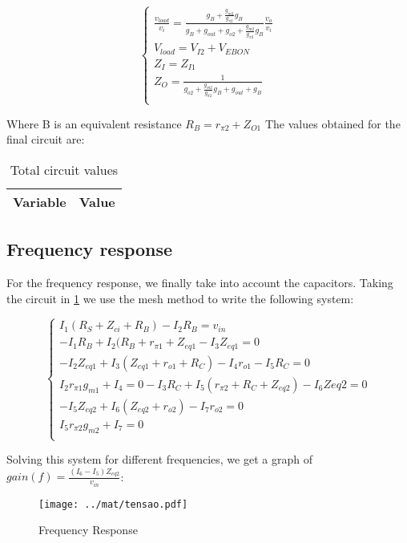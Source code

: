 \begin{equation}\label{eq:final}
\begin{cases}
\frac{v_{load}}{v_i}=\frac{g_B+\frac{g_{m2}}{g_{\pi 2}} g_B}{g_B+g_{out}+g_{o2}+\frac{g_{m2}}{g_{\pi 2}} g_B} \frac{v_o}{v_i}\\
V_{load}=V_{I2}+ V_{EBON}\\
Z_I=Z_{I1}\\
Z_O=\frac{1}{g_{o2}+\frac{g_{m2}}{g_{\pi 2}} g_B+g_{out}+g_B}\\
\end{cases}
\end{equation}

Where B is an equivalent resistance $R_B=r_{\pi 2} + Z_{O1}$
The values obtained for the final circuit are:

\begin{table}[H]
  \centering
  \begin{tabular}{|l|r|}
    \hline    
    {\bf Variable} & {\bf Value} \\ \hline
    
  \end{tabular}
  \caption{Total circuit values}
  \label{tab:sim1}
\end{table}

\subsection{Frequency response}
For the frequency response, we finally take into account the capacitors. Taking the circuit in \ref{fig:simp_cir} we use the mesh method to write the following system:

\begin{equation}\label{eq:freq}
\begin{cases}
I_1 (R_S+Z_{ci}+R_B) - I_2 R_B = v_{in}\\
-I_1 R_B +I_2 (R_B+r_{\pi 1} + Z_{eq1} -I_3 Z_{eq1} = 0\\
-I_2 Z_{eq1} + I_3 (Z_{eq1} + r_{o1} + R_C) -I_4 r_{o1} - I_5 R_C =0\\
I_2 r_{\pi 1} g_{m1} + I_4 = 0
-I_3 R_C + I_5 (r_{\pi 2} + R_C + Z_{eq2}) - I_6 Z{eq2} = 0\\
-I_5 Z_{eq2}+ I_6 (Z_{eq2} + r_{o2}) - I_7 r_{o2} =0\\
I_5 r_{\pi 2} g_{m2} +I_7 = 0\\
\end{cases}
\end{equation}

Solving this system for different frequencies, we get a graph of $gain(f)= \frac{(I_6 - I_5) Z_{eq2}}{v_{in}}$:

\begin{figure}[H] \centering
\texttt{[image: ../mat/tensao.pdf]}
\caption{Frequency Response}
\label{fig:simp_cir}
\end{figure}


